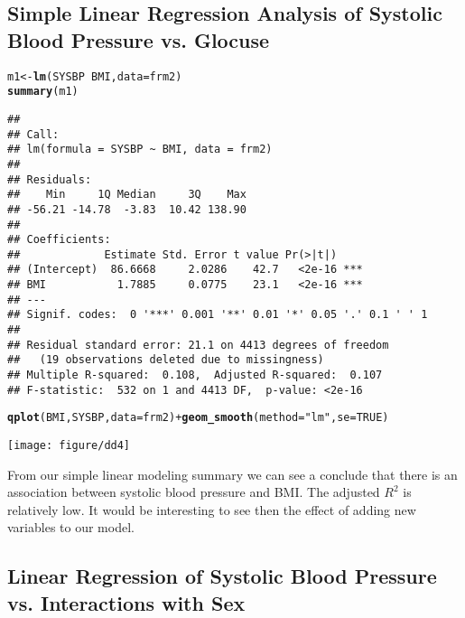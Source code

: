 \documentclass{article}\usepackage[]{graphicx}\usepackage[]{color}
\makeatletter
\def\maxwidth{ %
  \ifdim\Gin@nat@width>\linewidth
    \linewidth
  \else
    \Gin@nat@width
  \fi
}
\newcommand{\hlnum}[1]{\textcolor[rgb]{0.686,0.059,0.569}{#1}}%
\newcommand{\hlstr}[1]{\textcolor[rgb]{0.192,0.494,0.8}{#1}}%
\newcommand{\hlopt}[1]{\textcolor[rgb]{0,0,0}{#1}}%
\newcommand{\hlstd}[1]{\textcolor[rgb]{0.345,0.345,0.345}{#1}}%
\newcommand{\hlkwb}[1]{\textcolor[rgb]{0.69,0.353,0.396}{#1}}%
\newcommand{\hlkwc}[1]{\textcolor[rgb]{0.333,0.667,0.333}{#1}}%
\newcommand{\hlkwd}[1]{\textcolor[rgb]{0.737,0.353,0.396}{\textbf{#1}}}%
\newenvironment{kframe}{%
 \def\at@end@of@kframe{}%
 \ifinner\ifhmode%
  \def\at@end@of@kframe{\end{minipage}}%
  \begin{minipage}{\columnwidth}%
 \fi\fi%
 \def\FrameCommand##1{\hskip\@totalleftmargin \hskip-\fboxsep
 \colorbox{shadecolor}{##1}\hskip-\fboxsep
     \hskip-\linewidth \hskip-\@totalleftmargin \hskip\columnwidth}%
 \MakeFramed {\advance\hsize-\width
   \@totalleftmargin\z@ \linewidth\hsize
   \@setminipage}}%
 {\par\unskip\endMakeFramed%
 \at@end@of@kframe}
\newenvironment{knitrout}{}{} %
\makeatother
\begin{document}
\subsection{Simple Linear Regression Analysis of Systolic Blood Pressure vs. Glocuse}
\begin{knitrout}
\color{fgcolor}\begin{kframe}
\begin{alltt}
\hlstd{m1} \hlkwb{<-} \hlkwd{lm}\hlstd{(SYSBP} \hlopt{~} \hlstd{BMI,} \hlkwc{data} \hlstd{= frm2)}
\hlkwd{summary}\hlstd{(m1)}
\end{alltt}
\begin{verbatim}
## 
## Call:
## lm(formula = SYSBP ~ BMI, data = frm2)
## 
## Residuals:
##    Min     1Q Median     3Q    Max 
## -56.21 -14.78  -3.83  10.42 138.90 
## 
## Coefficients:
##             Estimate Std. Error t value Pr(>|t|)    
## (Intercept)  86.6668     2.0286    42.7   <2e-16 ***
## BMI           1.7885     0.0775    23.1   <2e-16 ***
## ---
## Signif. codes:  0 '***' 0.001 '**' 0.01 '*' 0.05 '.' 0.1 ' ' 1
## 
## Residual standard error: 21.1 on 4413 degrees of freedom
##   (19 observations deleted due to missingness)
## Multiple R-squared:  0.108,	Adjusted R-squared:  0.107 
## F-statistic:  532 on 1 and 4413 DF,  p-value: <2e-16
\end{verbatim}
\begin{alltt}
\hlkwd{qplot}\hlstd{(BMI, SYSBP,} \hlkwc{data} \hlstd{= frm2)} \hlopt{+} \hlkwd{geom_smooth}\hlstd{(}\hlkwc{method} \hlstd{=} \hlstr{"lm"}\hlstd{,} \hlkwc{se} \hlstd{=} \hlnum{TRUE}\hlstd{)}
\end{alltt}


{\ttfamily\noindent\color{warningcolor}{\#\# Warning: Removed 19 rows containing missing values (stat\_smooth).\\\#\# Warning: Removed 19 rows containing missing values (geom\_point).}}\end{kframe}
\texttt{[image: figure/dd4]} 

\end{knitrout}

From our simple linear modeling summary we can see a conclude that there is an association between systolic blood pressure and BMI.  The adjusted $R^2$ is relatively low.  It would be interesting to see then the effect of adding new variables to our model.

\subsection{Linear Regression of Systolic Blood Pressure vs. Interactions with Sex}
\end{document}
